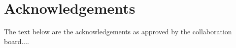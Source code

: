 \section*{Acknowledgements}

\noindent The text below are the acknowledgements as approved by the
collaboration board....
